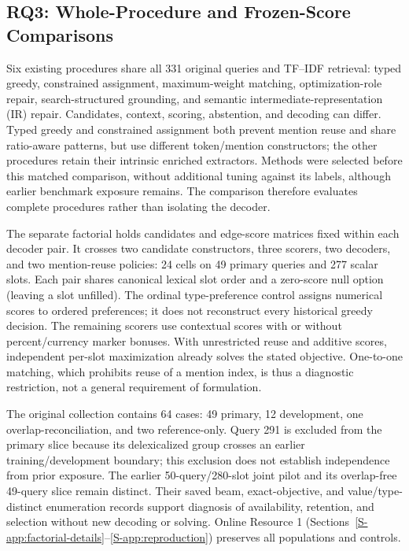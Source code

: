 \documentclass[pdflatex,iicol,sn-basic,Numbered]{sn-jnl}
\begin{document}
\subsection{RQ3: Whole-Procedure and Frozen-Score Comparisons}
\label{subsec:method_controls}
Six existing procedures share all 331 original queries and TF--IDF retrieval: typed greedy, constrained assignment, maximum-weight matching, optimization-role repair, search-structured grounding, and semantic intermediate-representation (IR) repair. Candidates, context, scoring, abstention, and decoding can differ. Typed greedy and constrained assignment both prevent mention reuse and share ratio-aware patterns, but use different token/mention constructors; the other procedures retain their intrinsic enriched extractors. Methods were selected before this matched comparison, without additional tuning against its labels, although earlier benchmark exposure remains. The comparison therefore evaluates complete procedures rather than isolating the decoder.

The separate factorial holds candidates and edge-score matrices fixed within each decoder pair. It crosses two candidate constructors, three scorers, two decoders, and two mention-reuse policies: 24 cells on 49 primary queries and 277 scalar slots. Each pair shares canonical lexical slot order and a zero-score null option (leaving a slot unfilled). The ordinal type-preference control assigns numerical scores to ordered preferences; it does not reconstruct every historical greedy decision. The remaining scorers use contextual scores with or without percent/currency marker bonuses. With unrestricted reuse and additive scores, independent per-slot maximization already solves the stated objective. One-to-one matching, which prohibits reuse of a mention index, is thus a diagnostic restriction, not a general requirement of formulation.

The original collection contains 64 cases: 49 primary, 12 development, one overlap-reconciliation, and two reference-only. Query 291 is excluded from the primary slice because its delexicalized group crosses an earlier training/development boundary; this exclusion does not establish independence from prior exposure. The earlier 50-query/280-slot joint pilot and its overlap-free 49-query slice remain distinct. Their saved beam, exact-objective, and value/type-distinct enumeration records support diagnosis of availability, retention, and selection without new decoding or solving. Online Resource 1 (Sections~\ref{S-app:factorial-details}--\ref{S-app:reproduction}) preserves all populations and controls.
\end{document}
